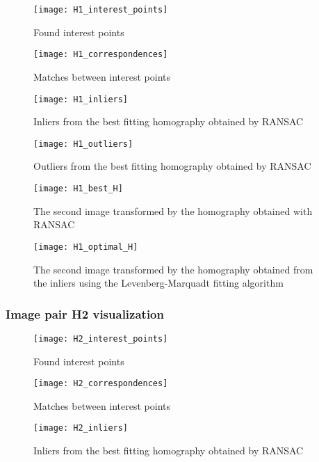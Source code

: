 \begin{figure}[H]
  \centering
  \texttt{[image: H1\_interest\_points]}
  \caption{Found interest points}
\end{figure}

\begin{figure}[H]
  \centering
  \texttt{[image: H1\_correspondences]}
  \caption{Matches between interest points}
\end{figure}

\begin{figure}[H]
  \centering
  \texttt{[image: H1\_inliers]}
  \caption{Inliers from the best fitting homography obtained by RANSAC}
\end{figure}

\begin{figure}[H]
  \centering
  \texttt{[image: H1\_outliers]}
  \caption{Outliers from the best fitting homography obtained by RANSAC}
\end{figure}

\begin{figure}[H]
  \centering
  \texttt{[image: H1\_best\_H]}
  \caption{The second image transformed by the homography obtained with RANSAC}
\end{figure}

\begin{figure}[H]
  \centering
  \texttt{[image: H1\_optimal\_H]}
  \caption{The second image transformed by the homography obtained from the
  inliers using the Levenberg-Marquadt fitting algorithm}
\end{figure}


\subsubsection{Image pair H2 visualization}

\begin{figure}[H]
  \centering
  \texttt{[image: H2\_interest\_points]}
  \caption{Found interest points}
\end{figure}

\begin{figure}[H]
  \centering
  \texttt{[image: H2\_correspondences]}
  \caption{Matches between interest points}
\end{figure}

\begin{figure}[H]
  \centering
  \texttt{[image: H2\_inliers]}
  \caption{Inliers from the best fitting homography obtained by RANSAC}
\end{figure}

